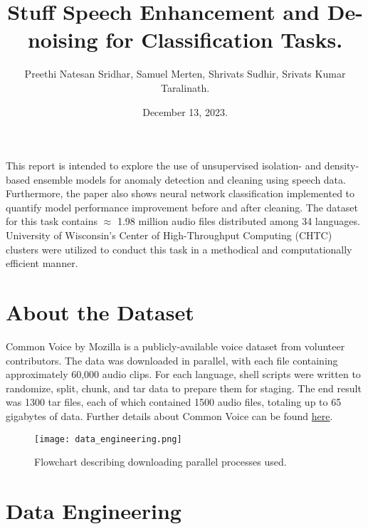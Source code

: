 \documentclass[letterpaper, 12pt]{article}
\title{\vspace{-2.0cm}Stuff}
\renewenvironment{abstract}
 {\small
  \begin{center}
  \bfseries \abstractname\vspace{-.5em}\vspace{0pt}
  \end{center}
  \list{}{%
    \setlength{\leftmargin}{3mm}%
    \setlength{\rightmargin}{\leftmargin}%
  }%
  \item\relax}
 {\endlist}
\begin{document}
\doublespacing

\title{\vspace{-1cm} Speech Enhancement and De-noising for Classification Tasks.}
\author{Preethi Natesan Sridhar, Samuel Merten, Shrivats Sudhir, Srivats Kumar Taralinath.}
\date{December 13, 2023.}

\maketitle

\begin{abstract}
This report is intended to explore the use of unsupervised isolation- and density-based ensemble models for anomaly detection and cleaning using speech data. Furthermore, the paper also shows neural network classification implemented to quantify model performance improvement before and after cleaning. The dataset for this task contains $\approx$ 1.98 million audio files distributed among 34 languages. University of Wisconsin's Center of High-Throughput Computing (CHTC) clusters were utilized to conduct this task in a methodical and computationally efficient manner.
\end{abstract}

\newpage
\section{About the Dataset}

Common Voice by Mozilla is a publicly-available voice dataset from volunteer contributors. The data was downloaded in parallel, with each file containing approximately 60,000 audio clips. For each language, shell scripts were written to randomize, split, chunk, and tar data to prepare them for staging. The end result was 1300 tar files, each of which contained 1500 audio files, totaling up to 65 gigabytes of data. Further details about Common Voice can be found \href{https://commonvoice.mozilla.org/en/about}{here}.

\begin{figure}[h]
    \centering
    \texttt{[image: data\_engineering.png]}
    \caption{Flowchart describing downloading parallel processes used.}
\end{figure} 

\newpage
\section{Data Engineering}
\end{document}
